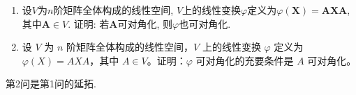 \documentclass[../../main.tex]{subfiles}
\begin{document}
\begin{example}
\begin{enumerate}
\item 设\(V\)为\(n\)阶矩阵全体构成的线性空间, \(V\)上的线性变换\(\varphi\)定义为\(\varphi(\boldsymbol{X})=\boldsymbol{A}\boldsymbol{X}\boldsymbol{A}\), 其中\(\boldsymbol{A}\in V\). 证明: 若\(\boldsymbol{A}\)可对角化, 则\(\varphi\)也可对角化.

\item 设 $V$ 为 $n$ 阶矩阵全体构成的线性空间，$V$ 上的线性变换 $\varphi$ 定义为 $\varphi(X)=AXA$，其中 $A\in V$。证明：$\varphi$ 可对角化的充要条件是 $A$ 可对角化。
\end{enumerate}
\end{example}
\begin{remark}
第2问是第1问的延拓.
\end{remark}
\end{document}
